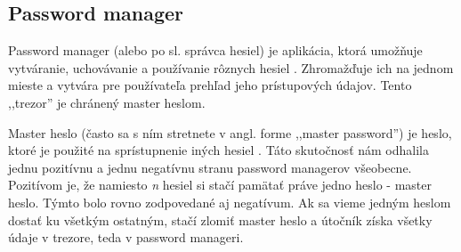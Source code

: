 \subsection{Password manager}
Password manager (alebo po sl. správca hesiel) je aplikácia, ktorá umožňuje vytváranie, uchovávanie a používanie rôznych hesiel \cite{sprava_hesiel}. Zhromažďuje ich na jednom mieste a vytvára pre používateľa prehľad jeho prístupových údajov. Tento ,,trezor'' je chránený master heslom.

Master heslo (často sa s ním stretnete v angl. forme ,,master password'') je heslo, ktoré je použité na sprístupnenie iných hesiel \cite{master_password}. Táto skutočnosť nám odhalila jednu pozitívnu a jednu negatívnu stranu password managerov všeobecne. Pozitívom je, že namiesto \textit{n} hesiel si stačí pamätať práve jedno heslo - master heslo. Týmto bolo rovno zodpovedané aj negatívum. Ak sa vieme jedným heslom dostať ku všetkým ostatným, stačí zlomiť master heslo a útočník získa všetky údaje v trezore, teda v password manageri.